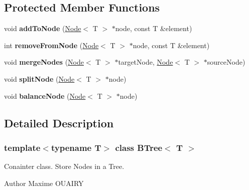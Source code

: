 \subsection*{Protected Member Functions}
\begin{DoxyCompactItemize}
\item 
\hypertarget{classBTree_ae00c15f7c2e8ce15b96b638ca11d229b}{
void {\bfseries addToNode} (\hyperlink{classNode}{Node}$<$ T $>$ $\ast$node, const T \&element)}
\label{classBTree_ae00c15f7c2e8ce15b96b638ca11d229b}

\item 
\hypertarget{classBTree_a15c88754591a5b67dcf26c6227a73b0e}{
int {\bfseries removeFromNode} (\hyperlink{classNode}{Node}$<$ T $>$ $\ast$node, const T \&element)}
\label{classBTree_a15c88754591a5b67dcf26c6227a73b0e}

\item 
\hypertarget{classBTree_aa3b3ba970b4cda4b1b34295355ca4ab6}{
void {\bfseries mergeNodes} (\hyperlink{classNode}{Node}$<$ T $>$ $\ast$targetNode, \hyperlink{classNode}{Node}$<$ T $>$ $\ast$sourceNode)}
\label{classBTree_aa3b3ba970b4cda4b1b34295355ca4ab6}

\item 
\hypertarget{classBTree_a7d02f5d149755d05c432f76feda25413}{
void {\bfseries splitNode} (\hyperlink{classNode}{Node}$<$ T $>$ $\ast$node)}
\label{classBTree_a7d02f5d149755d05c432f76feda25413}

\item 
\hypertarget{classBTree_a02675346b02d3510ac44922067e9bbf9}{
void {\bfseries balanceNode} (\hyperlink{classNode}{Node}$<$ T $>$ $\ast$node)}
\label{classBTree_a02675346b02d3510ac44922067e9bbf9}

\end{DoxyCompactItemize}


\subsection{Detailed Description}
\subsubsection*{template$<$typename T$>$ class BTree$<$ T $>$}

Conainter class. Store Nodes in a Tree. \begin{DoxyAuthor}{Author}
Maxime OUAIRY 
\end{DoxyAuthor}


